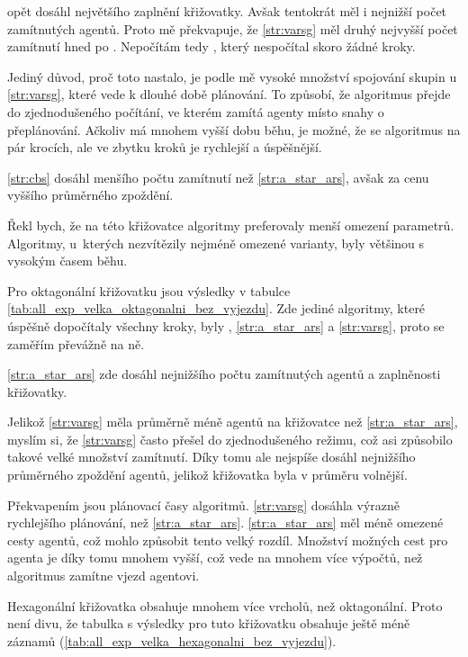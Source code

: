  opět dosáhl největšího zaplnění křižovatky.
Avšak tentokrát měl i nejnižší počet zamítnutých agentů.
Proto mě překvapuje, že \ref{str:varsg} měl druhý nejvyšší počet zamítnutí hned po .
Nepočítám tedy , který nespočítal skoro žádné kroky.

Jediný důvod, proč toto nastalo, je podle mě vysoké množství spojování skupin u \ref{str:varsg},
které vede k dlouhé době plánování.
To způsobí, že algoritmus přejde do zjednodušeného počítání, ve kterém zamítá agenty místo snahy o přeplánování.
Ačkoliv  má mnohem vyšší dobu běhu, je možné, že se algoritmus 
na pár krocích, ale ve zbytku kroků je rychlejší a úspěšnější.

\ref{str:cbs} dosáhl menšího počtu zamítnutí než \ref{str:a_star_ars}, avšak za cenu vyššího průměrného zpoždění.

Řekl bych, že na této křižovatce algoritmy preferovaly menší omezení parametrů.
Algoritmy, u~kterých nezvítězily nejméně omezené varianty, byly většinou s vysokým časem běhu.



Pro oktagonální křižovatku jsou výsledky v tabulce \ref{tab:all_exp_velka_oktagonalni_bez_vyjezdu}.
Zde jediné algoritmy, které úspěšně dopočítaly všechny kroky, byly
, \ref{str:a_star_ars} a \ref{str:varsg}, proto se zaměřím převážně na ně.

\ref{str:a_star_ars} zde dosáhl nejnižšího počtu zamítnutých agentů a zaplněnosti křižovatky.

Jelikož \ref{str:varsg} měla průměrně méně agentů na křižovatce než \ref{str:a_star_ars}, myslím si,
že \ref{str:varsg} často přešel do zjednodušeného režimu, což asi způsobilo takové velké množství zamítnutí.
Díky tomu ale nejspíše dosáhl nejnižšího průměrného zpoždění agentů, jelikož křižovatka byla v průměru volnější.

Překvapením jsou plánovací časy algoritmů.
\ref{str:varsg} dosáhla výrazně rychlejšího plánování, než \ref{str:a_star_ars}.
\ref{str:a_star_ars} měl méně omezené cesty agentů, což mohlo způsobit tento velký rozdíl.
Množství možných cest pro agenta je díky tomu mnohem vyšší, což vede na mnohem více výpočtů,
než algoritmus zamítne vjezd agentovi.



Hexagonální křižovatka obsahuje mnohem více vrcholů, než oktagonální.
Proto není divu,
že tabulka s výsledky pro tuto křižovatku obsahuje ještě méně záznamů (\ref{tab:all_exp_velka_hexagonalni_bez_vyjezdu}).


